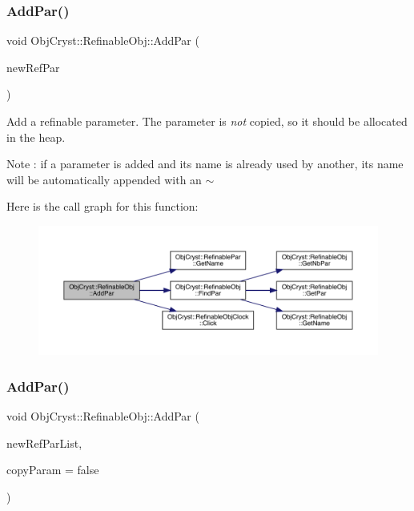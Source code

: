\subsubsection{\texorpdfstring{AddPar()}{AddPar()}\hspace{0.1cm}{\footnotesize\ttfamily [2/3]}}
{\footnotesize\ttfamily void Obj\+Cryst\+::\+Refinable\+Obj\+::\+Add\+Par (\begin{DoxyParamCaption}\item[{\mbox{\hyperlink{class_obj_cryst_1_1_refinable_par}{Refinable\+Par}} $\ast$}]{new\+Ref\+Par }\end{DoxyParamCaption})}

Add a refinable parameter. The parameter is {\itshape not} copied, so it should be allocated in the heap.

\begin{DoxyNote}{Note}
\+: if a parameter is added and its name is already used by another, its name will be automatically appended with an $\sim$ 
\end{DoxyNote}
Here is the call graph for this function\+:
\nopagebreak
\begin{figure}[H]
\begin{center}
\leavevmode
\includegraphics[width=350pt]{class_obj_cryst_1_1_refinable_obj_a4a792c84f7d35e71b3e89aae5a87bffa_cgraph}
\end{center}
\end{figure}
\mbox{\label{class_obj_cryst_1_1_refinable_obj_a6a28259e473fadd53fbc9b9bf7930813}} 
\subsubsection{\texorpdfstring{AddPar()}{AddPar()}\hspace{0.1cm}{\footnotesize\ttfamily [3/3]}}
{\footnotesize\ttfamily void Obj\+Cryst\+::\+Refinable\+Obj\+::\+Add\+Par (\begin{DoxyParamCaption}\item[{\mbox{\hyperlink{class_obj_cryst_1_1_refinable_obj}{Refinable\+Obj}} \&}]{new\+Ref\+Par\+List,  }\item[{const bool}]{copy\+Param = {\ttfamily false} }\end{DoxyParamCaption})}

